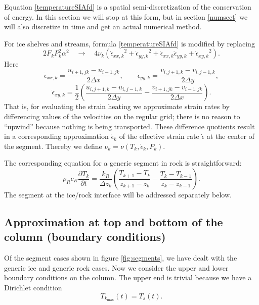 \documentclass[12pt,final]{amsart}%
\theoremstyle{plain}
\theoremstyle{definition}
\theoremstyle{remark}
\newcommand{\ddt}[1]{\ensuremath{\frac{\partial #1}{\partial t}}}
\def\eps{\epsilon}
\begin{document}
Equation \eqref{temperatureSIAfd} is a spatial semi-discretization of the conservation of energy.  In this section we will stop at this form, but in section \ref{numsect} we will also discretize in time and get an actual numerical method.

For ice shelves and streams, formula \eqref{temperatureSIAfd} is modified by replacing
\begin{equation}\label{icestreamstrainheatrule}
2 F_k P_k^2 \alpha^2 \quad\to\quad 4 \nu_k \left({\dot\eps_{xx,k}}^2 + {\dot\eps_{yy,k}}^2 + \dot\eps_{xx,k} \dot\eps_{yy,k} + {\dot\eps_{xy,k}}^2\right).
\end{equation}
Here
    $$\dot\eps_{xx,k} = \frac{u_{i+1,jk} - u_{i-1,jk}}{2\Delta x}, \qquad\dot\eps_{yy,k} = \frac{v_{i,j+1,k} - v_{i,j-1,k}}{2\Delta y},$$
    $$\dot\eps_{xy,k} = \frac{1}{2}\left(\frac{u_{i,j+1,k} - u_{i,j-1,k}}{2\Delta y} - \frac{v_{i+1,jk} - v_{i-1,jk}}{2\Delta x}\right).$$
That is, for evaluating the strain heating we approximate strain rates by differencing values of the velocities on the regular grid; there is no reason to ``upwind'' because nothing is being transported.  These difference quotients result in a corresponding approximation $\dot\eps_k$ of the effective strain rate $\dot\eps$ at the center of the segment.  Thereby we define $\nu_k = \nu(T_k,\dot\eps_k,P_k)$.

The corresponding equation for a generic segment in rock is straightforward:
\begin{equation}
\rho_R c_R \ddt{T_k} = \frac{k_R}{\Delta z_k} \left(\frac{T_{k+1}-T_k}{z_{k+1}-z_k} - \frac{T_k-T_{k-1}}{z_k-z_{k-1}}\right). \label{temperatureROCKfd}
\end{equation}
The segment at the ice/rock interface will be addressed separately below.

\subsection*{Approximation at top and bottom of the column (boundary conditions)}  Of the segment cases shown in figure \ref{fig:segments}, we have dealt with the generic ice and generic rock cases.  Now we consider the upper and lower boundary conditions on the column.  The upper end is trivial because we have a Dirichlet condition
\begin{equation}\label{topDirichlet}
T_{k_{\max}}(t) = T_s(t).
\end{equation}
\end{document}
